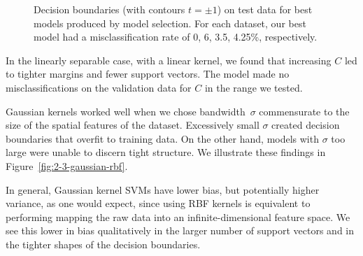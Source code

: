 \documentclass{article}
\begin{document}
\begin{multicols}{2}
\begin{figure}[t]
   \caption{Decision boundaries (with contours $t = \pm1$)
   on test data for best models produced by model selection.
   For each dataset, our best model had a misclassification rate of 0, 6, 3.5, 4.25\%, respectively.}
   \label{fig:2-3-model-selection}
\end{figure}

In the linearly separable case, with a linear kernel,
we found that increasing $C$ led to tighter margins and fewer support vectors.
The model made no misclassifications on the validation data for $C$ in the range we tested.

Gaussian kernels worked well when we chose bandwidth~$\sigma$
commensurate to the size of the spatial features of the dataset.
Excessively small $\sigma$ created decision boundaries that overfit to training data.
On the other hand, models with $\sigma$ too large were unable to discern tight structure.
We illustrate these findings in Figure~\ref{fig:2-3-gaussian-rbf}.

In general,
Gaussian kernel SVMs have lower bias,
but potentially higher variance,
as one would expect, since using RBF kernels is equivalent to
performing mapping the raw data into an infinite-dimensional feature space.
We see this lower in bias qualitatively
in the larger number of support vectors
and in the tighter shapes of the decision boundaries.


\end{multicols}
\end{document}
